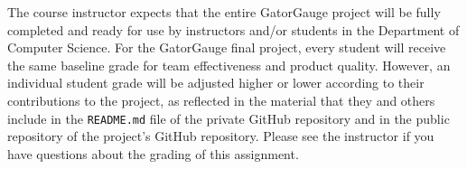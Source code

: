 \documentclass[11pt]{article}
\newcommand{\reflection}{\lstinline{README.md}}
\begin{document}
The course instructor expects that the entire GatorGauge project will be fully completed and ready for use by
instructors and/or students in the Department of Computer Science. For the GatorGauge final project, every student will
receive the same baseline grade for team effectiveness and product quality. However, an individual student grade will be
adjusted higher or lower according to their contributions to the project, as reflected in the material that they and
others include in the \reflection{} file of the private GitHub repository and in the public repository of the project's
GitHub repository. Please see the instructor if you have questions about the grading of this assignment.
\end{document}
